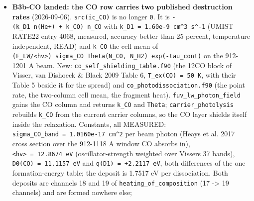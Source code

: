 \documentclass[english,a4paper]{my_memo}
\begin{document}
\begin{itemize}
  \texttt{post\_process\_adv} calls the same routine. Private build of the live tree:
  \texttt{grid\_and\_gates} 93/0 with \texttt{heat\_column\_matches\_breakdown\_total} 1.678e-16
  (was 6.886e-3), \texttt{physics\_probe} 557/0 incl. \texttt{heating\_channel\_closure} and
  the scanner \texttt{heating\_sum\_uniqueness} (one exception recorded: the band
  ledger of \texttt{write\_output.f90} restates the Lyman-Werner and FUV photolysis
  event energies, a fourth copy, assigned HYG-LEDGER-EPS). \texttt{Heating\_breakdown.txt}
  18 -\textgreater{} 21 columns; \texttt{\_adv} profiles move by up to 1.8e-2 (the Balmer and
  associative deposits the third copy lacked). \texttt{heat\_channel\_state} is
  class-1 state and enters the attempted-step checkpoint through B3c-COST
  (owner of \texttt{attempted\_step.f90}), assigned. HYG-CLASS6 (class 4/6 wording,
  \texttt{acc\_resmax} over both classes) in the same landing.
\item
  \textbf{B3b-CO landed: the CO row carries two published destruction rates}
  (2026-09-06). \texttt{src(ic\_CO)} is no longer \texttt{0}. It is
  \texttt{-(k\_D1\ n(He+)\ +\ k\_CO)\ n\_CO} with \texttt{k\_D1\ =\ 1.60e-9\ cm\^{}3\ s\^{}-1} (UMIST
  RATE22 entry 4068, measured, accuracy better than 25 percent,
  temperature independent, READ) and \texttt{k\_CO} the cell mean of
  \texttt{(F\_LW/\textless{}hv\textgreater{})\ sigma\_CO\ Theta(N\_CO,\ N\_H2)\ exp(-tau\_cont)} on the
  912-1201 A beam. New: \texttt{co\_self\_shielding\_table.f90} (the 12CO block of
  Visser, van Dishoeck \& Black 2009 Table 6, \texttt{T\_ex(CO)\ =\ 50\ K}, with their
  Table 5 beside it for the spread) and \texttt{co\_photodissociation.f90} (the
  point rate, the two-column cell mean, the fragment heat).
  \texttt{fuv\_lw\_photon\_field} gains the CO column and returns \texttt{k\_CO} and \texttt{Theta};
  \texttt{carrier\_photolysis} rebuilds \texttt{k\_CO} from the current carrier columns, so
  the CO layer shields itself inside the relaxation. Constants, all
  MEASURED: \texttt{sigma\_CO\_band\ =\ 1.0160e-17\ cm\^{}2} per beam photon (Heays et al.
  2017 cross section over the 912-1118 A window CO absorbs in),
  \texttt{\textless{}hv\textgreater{}\ =\ 12.8674\ eV} (oscillator-strength weighted over Visser\textquotesingle s 37
  bands), \texttt{D0(CO)\ =\ 11.1157\ eV} and \texttt{q(D1)\ =\ +2.2117\ eV}, both differences
  of the one formation-energy table; the deposit is 1.7517 eV per
  dissociation. Both deposits are channels 18 and 19 of
  \texttt{heating\_of\_composition} (17 -\textgreater{} 19 channels) and are formed nowhere else;

\end{itemize}
\end{document}
